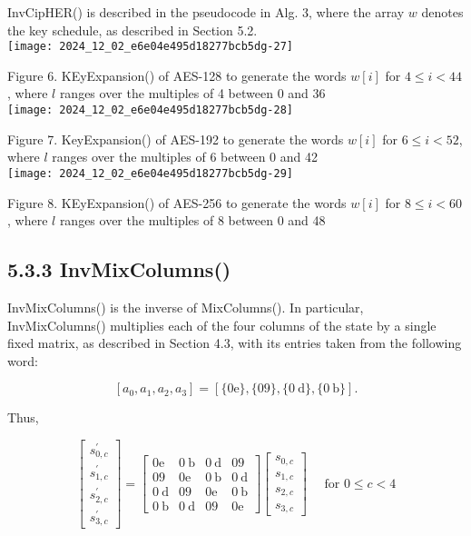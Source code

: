 InvCipHER() is described in the pseudocode in Alg. 3, where the array \(w\) denotes the key schedule, as described in Section 5.2.\\
\texttt{[image: 2024\_12\_02\_e6e04e495d18277bcb5dg-27]}

Figure 6. KEyExpansion() of AES-128 to generate the words \(w[i]\) for \(4 \leq i<44\), where \(l\) ranges over the multiples of 4 between 0 and 36\\
\texttt{[image: 2024\_12\_02\_e6e04e495d18277bcb5dg-28]}

Figure 7. KeyExpansion() of AES-192 to generate the words \(w[i]\) for \(6 \leq i<52\), where \(l\) ranges over the multiples of 6 between 0 and 42\\
\texttt{[image: 2024\_12\_02\_e6e04e495d18277bcb5dg-29]}

Figure 8. KEyExpansion() of AES-256 to generate the words \(w[i]\) for \(8 \leq i<60\), where \(l\) ranges over the multiples of 8 between 0 and 48

\subsection*{5.3.3 InvMixColumns()}
InvMixColumns() is the inverse of MixColumns(). In particular, InvMixColumns() multiplies each of the four columns of the state by a single fixed matrix, as described in Section 4.3, with its entries taken from the following word:

\[
\left[a_{0}, a_{1}, a_{2}, a_{3}\right]=[\{0 \mathrm{e}\},\{09\},\{0 \mathrm{~d}\},\{0 \mathrm{~b}\}] .
\]

Thus,

\[
\left[\begin{array}{c}
s_{0, c}^{\prime} \\
s_{1, c}^{\prime} \\
s_{2, c}^{\prime} \\
s_{3, c}^{\prime}
\end{array}\right]=\left[\begin{array}{cccc}
0 \mathrm{e} & 0 \mathrm{~b} & 0 \mathrm{~d} & 09 \\
09 & 0 \mathrm{e} & 0 \mathrm{~b} & 0 \mathrm{~d} \\
0 \mathrm{~d} & 09 & 0 \mathrm{e} & 0 \mathrm{~b} \\
0 \mathrm{~b} & 0 \mathrm{~d} & 09 & 0 \mathrm{e}
\end{array}\right]\left[\begin{array}{l}
s_{0, c} \\
s_{1, c} \\
s_{2, c} \\
s_{3, c}
\end{array}\right] \quad \text { for } 0 \leq c<4
\]

